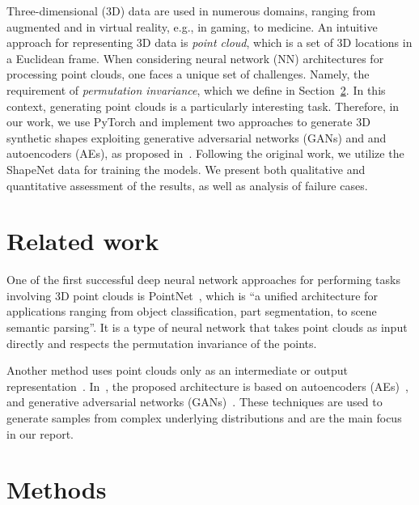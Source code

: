 \documentclass[12pt]{article}
\newcommand{\contentdescription}[1]{}
\begin{document}
    Three-dimensional (3D) data are used in numerous domains, ranging from augmented and in virtual reality, e.g., in gaming, to medicine.
    An intuitive approach for representing 3D data is \emph{point cloud}, which is a set of 3D locations in a Euclidean frame.
    When considering neural network (NN) architectures for processing point clouds, one faces a unique set of challenges. Namely, the requirement of \textit{permutation invariance}, which we define in Section~\ref{methods}.
    In this context, generating point clouds is a particularly interesting task.
    Therefore, in our work, we use PyTorch and implement two approaches to generate 3D synthetic shapes exploiting generative adversarial networks (GANs) and and autoencoders (AEs), as proposed in~\cite{pmlr-v80-achlioptas18a}. Following the original work, we utilize the ShapeNet data for training the models. We present both qualitative and quantitative assessment of the results, as well as analysis of failure cases.


    \section{Related work}
    \contentdescription{
        Related Work (5-15\%):
        Discuss the published work related to your project paper, the types of experiments you do and the additional method that you have added to this work or you have compared this paper with (if any).
    }

    One of the first successful deep neural network approaches for performing tasks involving 3D point clouds is PointNet~\cite{arxiv:1612.00593},
    which is ``a unified architecture for applications ranging from object classification, part segmentation, to scene semantic parsing''.
    It is a type of neural network that takes point clouds as input directly and respects the permutation invariance of the points.

    Another method uses point clouds only as an intermediate or output representation~\cite{arxiv:1612.02808, arxiv:1612.00603}.
    In~\cite{pmlr-v80-achlioptas18a}, the proposed architecture is based on autoencoders (AEs)~\cite{doi:10.5555/65669.104451, arxiv:1312.6114},
    and generative adversarial networks (GANs)~\cite{NIPS2014_5ca3e9b1, arxiv:1511.06434, arxiv:1612.02136}.
    These techniques are used to generate samples from complex underlying distributions and are the main focus in our report.


    \section{Methods}
    \label{methods}
    \contentdescription{
        Methods (15-25\%):
        Describe the original paper's method to the extent that you would need to make your report and findings understandable.
        Otherwise, here you can describe other methods that you compare with or other methods that you apply on top of what you reimplemented.
        Here, you also try to justify any methodical modification or incremental changes that you have added to the original paper.
        It may be helpful to include figures, diagrams, or tables to describe your method or compare it with other methods.
    }
\end{document}
